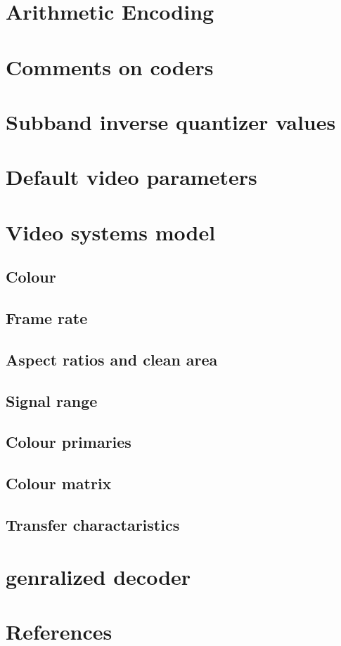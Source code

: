 \appendix
\section{Arithmetic Encoding}
\section{Comments on coders}
\section{Subband inverse quantizer values}
\clearpage
\section{Default video parameters}

\clearpage
\section{Video systems model}
\subsection{Colour}
\subsection{Frame rate}
\subsection{Aspect ratios and clean area}
\subsection{Signal range}
\subsection{Colour primaries}
\subsection{Colour matrix}
\subsection{Transfer charactaristics}

\clearpage
\section{genralized decoder}

\clearpage
\section{References}

